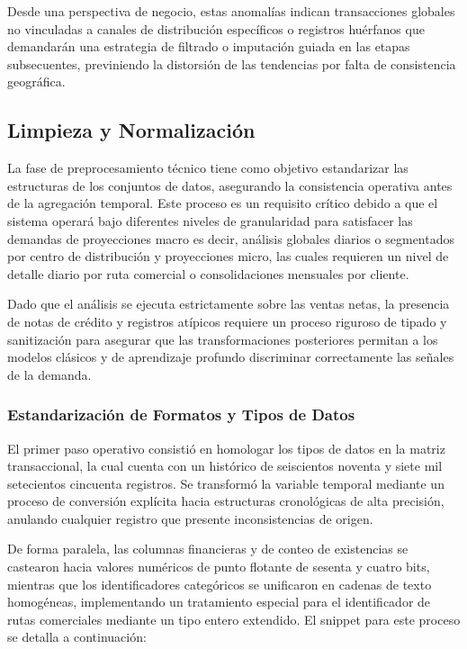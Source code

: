 \documentclass[11pt,a4paper]{report}
\begin{document}
        Desde una perspectiva de negocio, estas anomalías indican transacciones globales no vinculadas a canales de distribución específicos o
        registros huérfanos que demandarán una estrategia de filtrado o imputación guiada en las etapas subsecuentes, previniendo la distorsión
        de las tendencias por falta de consistencia geográfica.

    \subsection{Limpieza y Normalización}
    La fase de preprocesamiento técnico tiene como objetivo estandarizar las estructuras de los conjuntos de datos, asegurando la consistencia operativa antes de la agregación temporal.
    Este proceso es un requisito crítico debido a que el sistema operará bajo diferentes niveles de granularidad para satisfacer las demandas de proyecciones
    macro es decir, análisis globales diarios o segmentados por centro de distribución y proyecciones micro,
    las cuales requieren un nivel de detalle diario por ruta comercial o consolidaciones mensuales por cliente. 

    Dado que el análisis se ejecuta estrictamente sobre las ventas netas, la presencia de notas de crédito y registros atípicos requiere un proceso riguroso de tipado y
    sanitización para asegurar que las transformaciones posteriores permitan a los modelos clásicos y de aprendizaje profundo discriminar
    correctamente las señales de la demanda.

    \subsubsection{Estandarización de Formatos y Tipos de Datos}
    El primer paso operativo consistió en homologar los tipos de datos en la matriz transaccional, la cual cuenta con un histórico de seiscientos noventa
    y siete mil setecientos cincuenta registros.
    Se transformó la variable temporal mediante un proceso de conversión explícita hacia estructuras cronológicas de alta precisión,
    anulando cualquier registro que presente inconsistencias de origen. 

    De forma paralela, las columnas financieras y de conteo de existencias se castearon hacia valores numéricos de punto flotante de sesenta y cuatro bits,
    mientras que los identificadores categóricos se unificaron en cadenas de texto homogéneas, implementando un tratamiento especial para el identificador
    de rutas comerciales mediante un tipo entero extendido. El snippet para este proceso se detalla a continuación:
\end{document}
